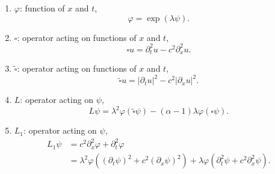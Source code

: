 \documentclass[11pt]{amsart}
\numberwithin{algorithm}{section}
\numberwithin{equation}{section}
\begin{document}
\begin{tcolorbox}[colback=blue!5, colframe=blue!70, title=Definitions and notations]
\begin{enumerate}
    \item $\varphi$: function of $x$ and $t$,
    \begin{equation*}
        \varphi
        =
        \exp(\lambda \psi).
    \end{equation*}

    \item $\square$: operator acting on functions of $x$ and $t$,
    \begin{equation*}
        \square u
        =
        \partial_{t}^{2} u - c^{2} \partial_{x}^{2} u.
    \end{equation*}

    \item $\widetilde{\square}$: operator acting on functions of $x$ and $t$,
    \begin{equation*}
        \widetilde{\square} u
        =
        |\partial_{t} u|^{2} - c^{2}|\partial_{x} u|^{2}.
    \end{equation*}

    \item $L$: operator acting on $\psi$,
    \begin{equation*}
        L \psi
        =
        \lambda^{2} \varphi (\widetilde{\square} \psi)
        -
        (\alpha - 1) \lambda \varphi (\square \psi).
    \end{equation*}

    \item $L_{1}$: operator acting on $\psi$,
    \begin{equation*}
        \begin{aligned}
            L_{1} \psi
            &=
            c^{2} \partial_{x}^{2} \varphi
            +
            \partial_{t}^{2} \varphi\\
            &=
            \lambda^{2} \varphi
            \left (
                (\partial_{t} \psi)^{2}
                +
                c^{2} (\partial_{x} \psi)^{2}
            \right )
            +
            \lambda \varphi
            \left (
                \partial_{t}^{2} \psi
                +
                c^{2} \partial_{x}^{2} \psi
            \right ).
        \end{aligned}
    \end{equation*}


\end{enumerate}
\end{tcolorbox}
\end{document}
